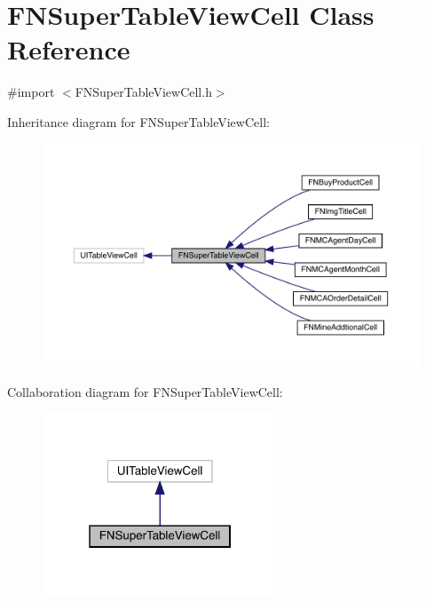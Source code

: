 \hypertarget{interface_f_n_super_table_view_cell}{}\section{F\+N\+Super\+Table\+View\+Cell Class Reference}
\label{interface_f_n_super_table_view_cell}


{\ttfamily \#import $<$F\+N\+Super\+Table\+View\+Cell.\+h$>$}



Inheritance diagram for F\+N\+Super\+Table\+View\+Cell\+:\nopagebreak
\begin{figure}[H]
\begin{center}
\leavevmode
\includegraphics[width=350pt]{interface_f_n_super_table_view_cell__inherit__graph}
\end{center}
\end{figure}


Collaboration diagram for F\+N\+Super\+Table\+View\+Cell\+:\nopagebreak
\begin{figure}[H]
\begin{center}
\leavevmode
\includegraphics[width=199pt]{interface_f_n_super_table_view_cell__coll__graph}
\end{center}
\end{figure}


